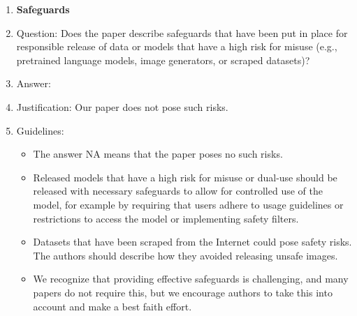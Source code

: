 \documentclass{article}
\theoremstyle{plain}
\theoremstyle{definition}
\theoremstyle{remark}
\begin{document}
\begin{enumerate}
\item {\bf Safeguards}
    \item[] Question: Does the paper describe safeguards that have been put in place for responsible release of data or models that have a high risk for misuse (e.g., pretrained language models, image generators, or scraped datasets)?
    \item[] Answer: \answerNA{} %
    \item[] Justification: Our paper does not pose such risks.
    \item[] Guidelines:
    \begin{itemize}
        \item The answer NA means that the paper poses no such risks.
        \item Released models that have a high risk for misuse or dual-use should be released with necessary safeguards to allow for controlled use of the model, for example by requiring that users adhere to usage guidelines or restrictions to access the model or implementing safety filters. 
        \item Datasets that have been scraped from the Internet could pose safety risks. The authors should describe how they avoided releasing unsafe images.
        \item We recognize that providing effective safeguards is challenging, and many papers do not require this, but we encourage authors to take this into account and make a best faith effort.
    \end{itemize}


\end{enumerate}
\end{document}
